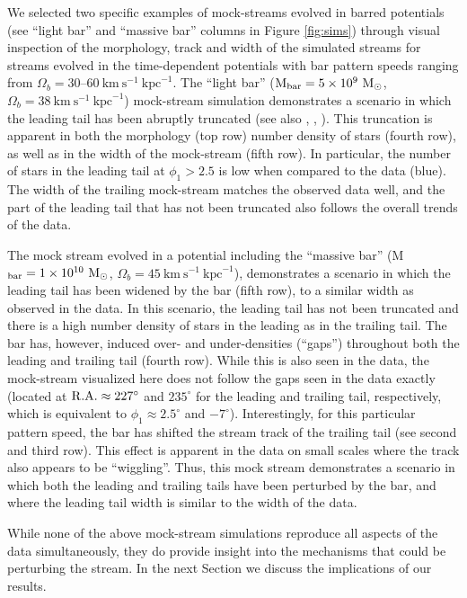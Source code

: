 \documentclass[twocolumn]{aastex62}
\newcommand{\msun}{\textrm{M}_\odot}
\newcommand{\kmskpc}{\ensuremath{\textrm{km}~\textrm{s}^{-1}~\textrm{kpc}^{-1}}}
\begin{document}
We selected two specific examples of mock-streams evolved in barred potentials (see ``light bar'' and ``massive bar'' columns in Figure \ref{fig:sims}) through visual inspection of the morphology, track and width of the simulated streams for streams evolved in the time-dependent potentials with bar pattern speeds ranging from $\Omega_b = 30$--$60~\kmskpc$.
The ``light bar''  ($\textrm{M}_{\rm bar} = 5\times 10^{9}~\msun$, $\Omega_b = 38 ~\kmskpc$) mock-stream simulation demonstrates a scenario in which the leading tail has been abruptly truncated (see also \citealt{Price-Whelan:2016b}, \citealt{Pearson:2017}, \citealt{Erkal:2017}).
This truncation is apparent in both the morphology (top row) number density of stars (fourth row), as well as in the width of the mock-stream (fifth row).
In particular, the number of stars in the leading tail at $\phi_1 > 2.5$ is low when compared to the data (blue).
The width of the trailing mock-stream matches the observed data well, and the part of the leading tail that has not been truncated also follows the overall trends of the data.

The mock stream evolved in a potential including the  ``massive bar'' (M$_{\rm bar} = 1\times 10^{10}~\msun$, $\Omega_b = 45~\kmskpc$), demonstrates a scenario in which the leading tail has been widened by the bar (fifth row), to a similar width as observed in the data.
In this scenario, the leading tail has not been truncated and there is a high number density of stars in the leading as in the trailing tail.
The bar has, however, induced over- and under-densities (``gaps'') throughout both the leading and trailing tail  (fourth row).
While this is also seen in the data, the mock-stream visualized here does not follow the gaps seen in the data exactly (located at $\rm R.A.\approx 227^\circ$ and $235^\circ$ for the leading and trailing tail, respectively, which is equivalent to $\phi_1 \approx 2.5^\circ$ and $-7^\circ$).
Interestingly, for this particular pattern speed, the bar has shifted the stream track of the trailing tail  (see second and third row).
This effect is apparent in the data on small scales where the track also appears to be ``wiggling''.
Thus, this mock stream demonstrates a scenario in which both the leading and trailing tails have been perturbed by the bar, and where the leading tail width is similar to the width of the data.

While none of the above mock-stream simulations reproduce all aspects of the data simultaneously, they do provide insight into the mechanisms that could be perturbing the stream.
In the next Section we discuss the implications of our results.
\end{document}
